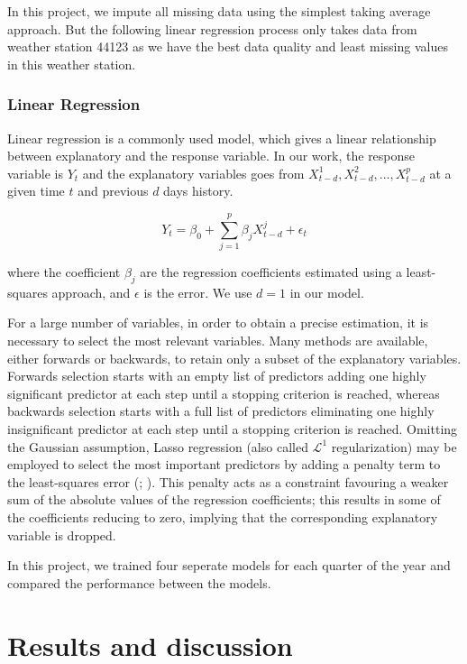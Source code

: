 \documentclass[12pt]{article}
\begin{document}
In this project, we impute all missing data using the simplest taking average approach. But the following linear regression process only takes data from weather station 44123 as we have the best data quality and least missing values in this weather station.

\subsubsection{Linear Regression}

Linear regression is a commonly used model, which gives a linear relationship between explanatory and the response variable. In our work, the response variable is $Y_t$ and the explanatory variables goes from $X_{t-d}^1, X_{t-d}^2,\ldots,X_{t-d}^p$ at a given time $t$ and previous $d$ days history.

\begin{equation}
	Y_{t} = \beta_0+\sum_{j=1}^p \beta_j X_{t-d}^j + \epsilon_t
\end{equation}

where the coefficient $\beta_j$ are the regression coefficients estimated using a least-squares approach, and $\epsilon$ is the error. We use $d=1$ in our model.

For a large number of variables, in order to obtain a precise estimation, it is necessary to select the most relevant variables. Many methods are available, either forwards or backwards, to retain only a subset of the explanatory variables. Forwards selection starts with an empty list of predictors adding one highly significant predictor at each step until a stopping criterion is reached, whereas backwards selection starts with a full list of predictors eliminating one highly insignificant predictor at each step until a stopping criterion is reached. Omitting the Gaussian assumption, Lasso regression (also called $\mathcal{L}^1$ regularization) may be employed to select the most important predictors by adding a penalty term to the least-squares error (\cite{ISL2}; \cite{Tibshirani1996}). This penalty acts as a constraint favouring a weaker sum of the absolute values of the regression coefficients; this results in some of the coefficients reducing to zero, implying that the corresponding explanatory variable is dropped.

In this project, we trained four seperate models for each quarter of the year and compared the performance between the models.

\section{Results and discussion}
\end{document}
